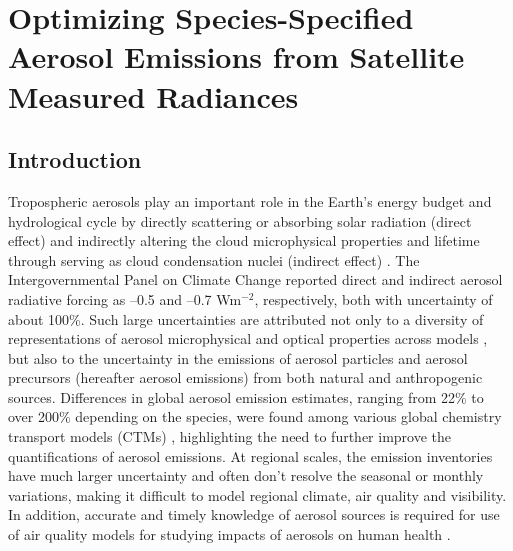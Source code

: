\chapter{Optimizing Species-Specified Aerosol Emissions from Satellite
Measured Radiances} \label{ch:optems}

\section{Introduction}

Tropospheric aerosols play an important role in the Earth’s energy budget and
hydrological cycle by directly scattering or absorbing solar radiation
(direct effect) and indirectly altering the cloud microphysical
properties and lifetime through serving as cloud condensation nuclei
(indirect effect) \citep{Haywood00}. The Intergovernmental Panel on
Climate Change \citep{IPCC07} reported direct and indirect aerosol
radiative forcing as --0.5 and --0.7 Wm$^{-2}$, respectively, both with 
uncertainty of about 100\%. Such large uncertainties are attributed not only 
to a diversity of representations of aerosol microphysical and optical 
properties across models \citep{Schulz06}, but also to the uncertainty in the 
emissions of aerosol particles and aerosol precursors (hereafter aerosol 
emissions) from both natural and anthropogenic sources.  Differences in global
aerosol emission estimates, ranging from 22\% to over 200\% depending on the 
species, were found among various global chemistry transport models (CTMs) 
\citep{Textor06}, highlighting the need to further improve the quantifications
of aerosol emissions. At regional scales, the emission inventories have much
larger uncertainty \citep{Streets03} and often don’t resolve the seasonal or
monthly variations, making it difficult to model regional climate, air quality
and visibility. In addition, accurate and timely knowledge of aerosol sources
is required for use of air quality models for studying impacts of aerosols on
human health \citep{Pope09}.


